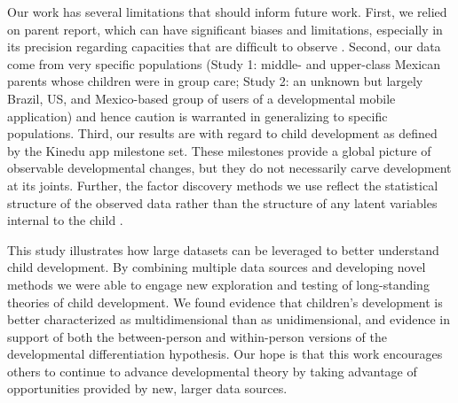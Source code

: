 \documentclass[man, floatsintext]{apa7}
\begin{document}
Our work has several limitations that should inform future work. First,
we relied on parent report, which can have signiﬁcant biases and
limitations, especially in its precision regarding capacities that are
difﬁcult to observe \parencite[e.g., cognitive abilities;][]{frank2021,feldman2000}. Second, our
data come from very speciﬁc populations (Study 1: middle- and
upper-class Mexican parents whose children were in group care; Study 2:
an unknown but largely Brazil, US, and Mexico-based group of users of a developmental mobile application) and hence
caution is warranted in generalizing to specific populations. Third, our results are with regard to child development
as deﬁned by the Kinedu app milestone set. These milestones provide a global picture of observable developmental changes, but they do not necessarily carve development at its joints. Further, the factor discovery methods we use reflect the statistical structure of the observed data rather than the structure of any latent variables internal to the child \parencite{bork2017,maraun2003,van-der-maas2006}.

This study illustrates how
large datasets can be leveraged to better understand child development. By
combining multiple data sources and developing novel methods we
were able to engage new exploration and testing of long-standing theories of child development. We found evidence that children's development is better characterized as multidimensional than as unidimensional, and evidence in support of both the between-person and within-person versions of the
developmental differentiation hypothesis. Our hope is
that this work encourages others to continue to advance developmental
theory by taking advantage of opportunities provided by new,
larger data sources.

\printbibliography
\end{document}
